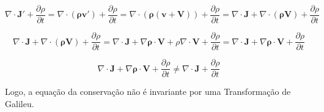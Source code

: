 \documentclass[10pt,a4paper]{article}
\begin{document}
\begin{equation*}
	\nabla\cdot\mathbf{J'} + \dfrac{\partial \rho}{\partial t} = \nabla\cdot\mathbf{(\rho\mathbf{v}')} + \dfrac{\partial \rho}{\partial t} = \nabla\cdot\mathbf{(\rho(\mathbf{v} +\mathbf{V}))} + \dfrac{\partial \rho}{\partial t} = \nabla\cdot\mathbf{J} + \nabla\cdot\mathbf{(\rho\mathbf{V})} + \dfrac{\partial \rho}{\partial t}
\end{equation*}

\begin{equation*}
	\nabla\cdot\mathbf{J} + \nabla\cdot\mathbf{(\rho\mathbf{V})} + \dfrac{\partial \rho}{\partial t} = \nabla\cdot\mathbf{J} + \nabla\mathbf{\rho}\cdot\mathbf{V} + \rho\nabla\cdot\mathbf{\mathbf{V}} + \dfrac{\partial \rho}{\partial t} = \nabla\cdot\mathbf{J} + \nabla\mathbf{\rho}\cdot\mathbf{V} + \dfrac{\partial \rho}{\partial t}
\end{equation*}

\begin{equation*}
	\nabla\cdot\mathbf{J} + \nabla\mathbf{\rho}\cdot\mathbf{V} + \dfrac{\partial \rho}{\partial t} \neq \nabla\cdot\mathbf{J} + \dfrac{\partial \rho}{\partial t}
\end{equation*}

Logo, a equação da conservação não é invariante por uma Transformação de Galileu.
\end{document}
